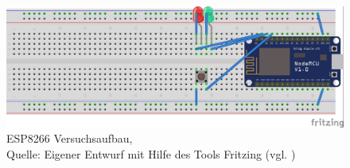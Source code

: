 \begin{figure}[!htb]
	\centering
	\includegraphics[scale=0.6]{ESP_Fritzing.jpg}
	\caption[ESP8266 Versuchsaufbau]{ESP8266 Versuchsaufbau,\\ Quelle: Eigener Entwurf mit Hilfe des Tools Fritzing (vgl. \cite{.s})}
\end{figure}